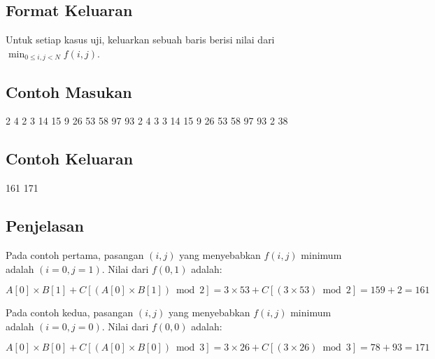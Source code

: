 \documentclass[../main_problemset.tex]{subfiles} %
\begin{document}
\subsection*{Format Keluaran}

Untuk setiap kasus uji, keluarkan sebuah baris berisi nilai dari $ \min_{0 \le i,j < N} f(i,j) $.

\vspace{.4cm}

\begin{minipage}[t]{0.5\textwidth}
\subsection*{Contoh Masukan}

\begin{lcverbatim}
2
4 2
3 14 15 9
26 53 58 97
93 2
4 3
3 14 15 9
26 53 58 97
93 2 38
\end{lcverbatim}
\end{minipage}
\begin{minipage}[t]{0.5\textwidth}
\subsection*{Contoh Keluaran}

\begin{lcverbatim}
161
171
\end{lcverbatim}
\end{minipage}

\pagebreak
\subsection*{Penjelasan}

Pada contoh pertama, pasangan $ (i,j) $ yang menyebabkan $ f(i,j) $ minimum adalah $ (i=0,j=1) $. Nilai dari $ f(0,1) $ adalah:

$$
A[0]\times B[1]+C[(A[0]\times B[1])\bmod 2]=3\times 53+C[(3\times 53)\bmod 2]=159+2=161
$$

Pada contoh kedua, pasangan $ (i,j) $ yang menyebabkan $ f(i,j) $ minimum adalah $ (i=0,j=0) $. Nilai dari $ f(0,0) $ adalah:

$$
A[0]\times B[0]+C[(A[0]\times B[0])\bmod 3]=3\times 26+C[(3\times 26)\bmod 3]=78+93=171
$$
\end{document}
